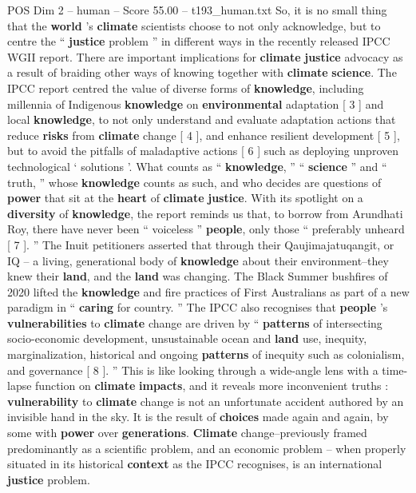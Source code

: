 \begin{textsample}{POS Dim 2 – human – Score 55.00 – t193\_human.txt}
So, it is no small thing that the \textbf{world} ’s \textbf{climate} scientists choose to not only acknowledge, but to centre the “ \textbf{justice} problem ” in different ways in the recently released IPCC WGII report.
There are important implications for \textbf{climate} \textbf{justice} advocacy as a result of braiding other ways of knowing together with \textbf{climate} \textbf{science}.
The IPCC report centred the value of diverse forms of \textbf{knowledge}, including millennia of Indigenous \textbf{knowledge} on \textbf{environmental} adaptation [ 3 ] and local \textbf{knowledge}, to not only understand and evaluate adaptation actions that reduce \textbf{risks} from \textbf{climate} change [ 4 ], and enhance resilient development [ 5 ], but to avoid the pitfalls of maladaptive actions [ 6 ] such as deploying unproven technological ‘ solutions ’.
What counts as “ \textbf{knowledge}, ” “ \textbf{science} ” and “ truth, ” whose \textbf{knowledge} counts as such, and who decides are questions of \textbf{power} that sit at the \textbf{heart} of \textbf{climate} \textbf{justice}.
With its spotlight on a \textbf{diversity} of \textbf{knowledge}, the report reminds us that, to borrow from Arundhati Roy, there have never been “ voiceless ” \textbf{people}, only those “ preferably unheard [ 7 ]. ” The Inuit petitioners asserted that through their Qaujimajatuqangit, or IQ – a living, generational body of \textbf{knowledge} about their environment–they knew their \textbf{land}, and the \textbf{land} was changing.
The Black Summer bushfires of 2020 lifted the \textbf{knowledge} and fire practices of First Australians as part of a new paradigm in “ \textbf{caring} for country. ” The IPCC also recognises that \textbf{people} ’s \textbf{vulnerabilities} to \textbf{climate} change are driven by “ \textbf{patterns} of intersecting socio-economic development, unsustainable ocean and \textbf{land} use, inequity, marginalization, historical and ongoing \textbf{patterns} of inequity such as colonialism, and governance [ 8 ]. ” This is like looking through a wide-angle lens with a time-lapse function on \textbf{climate} \textbf{impacts}, and it reveals more inconvenient truths : \textbf{vulnerability} to \textbf{climate} change is not an unfortunate accident authored by an invisible hand in the sky.
It is the result of \textbf{choices} made again and again, by some with \textbf{power} over \textbf{generations}. \textbf{Climate} change–previously framed predominantly as a scientific problem, and an economic problem – when properly situated in its historical \textbf{context} as the IPCC recognises, is an international \textbf{justice} problem.

\end{textsample}
